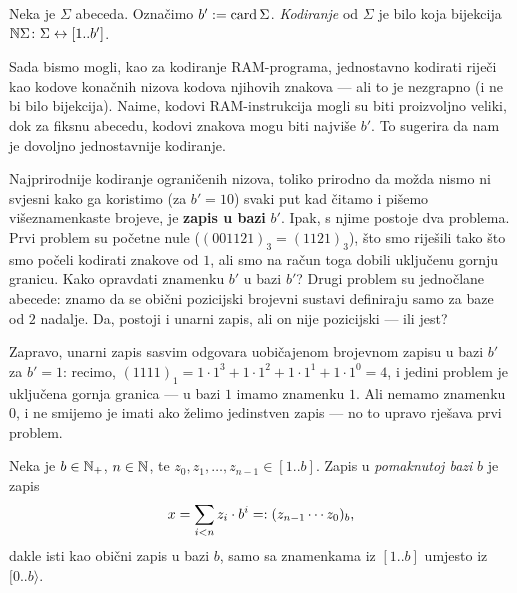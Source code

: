 \begin{definicija}
Neka je $\Sigma$ abeceda. Označimo $b':=\operatorname{card}\Sigma$. %
\emph{Kodiranje} od $\Sigma$ je bilo koja bijekcija ${\mathbb N}\Sigma\colon\Sigma\leftrightarrow[1..b']$.
\end{definicija}


Sada bismo mogli, kao za kodiranje RAM-programa, jednostavno kodirati riječi kao kodove konačnih nizova kodova njihovih znakova --- ali to je nezgrapno (i ne bi bilo bijekcija). Naime, kodovi RAM-instrukcija mogli su biti proizvoljno veliki, dok za fiksnu abecedu, kodovi znakova mogu biti najviše $b'$. To sugerira da nam je dovoljno jednostavnije kodiranje.

Najprirodnije kodiranje ograničenih nizova, toliko prirodno da možda nismo ni svjesni kako ga koristimo (za $b'=10$) svaki put kad čitamo i pišemo višeznamenkaste brojeve, je \textbf{zapis u bazi} $b'$. Ipak, s njime postoje dva problema. Prvi problem su početne nule ($(001121)_3=(1121)_3$), što smo riješili tako što smo počeli kodirati znakove od $1$, ali smo na račun toga dobili uključenu gornju granicu. Kako opravdati znamenku $b'$ u bazi $b'$? Drugi problem su jednočlane abecede: znamo da se obični pozicijski brojevni sustavi definiraju samo za baze od $2$ nadalje. Da, postoji i unarni zapis, ali on nije pozicijski --- ili jest?

Zapravo, unarni zapis sasvim odgovara uobičajenom brojevnom zapisu u bazi $b'$ za $b'=1$: recimo, $(1111)_1=1\cdot1^3+1\cdot1^2+1\cdot1^1+1\cdot1^0=4$, i jedini problem je uključena gornja granica --- u bazi $1$ imamo znamenku $1$. Ali nemamo znamenku $0$, i ne smijemo je imati ako želimo jedinstven zapis --- no to upravo rješava prvi problem.

\begin{definicija}
Neka je $b\in{\mathbb N}_+$, $n\in{\mathbb N}$, te $z_0,z_1,\dotsc,z_{n-1}\in[1..b]$. Zapis u \emph{pomaknutoj bazi} $b$ je zapis
\begin{equation}\label{eq:pomakbaza}
    x=\sum_{i<n}z_i\cdot b^i=:(z_{n-1}\dotsm z_0)_b\text,
\end{equation}
dakle isti kao obični zapis u bazi $b$, samo sa znamenkama iz $[1..b]$ umjesto iz $[0..b\rangle$.
\end{definicija}

